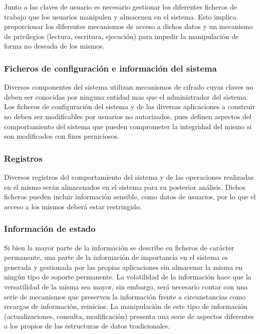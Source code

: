 Junto a las claves de usuario es necesario gestionar los diferentes ficheros de trabajo que los usuarios manipulen y almacenen en el sistema. Esto implica proporcionar los diferentes mecanismos de acceso a dichos datos y un mecanismo de privilegios (lectura, escritura, ejecución) para impedir la manipulación de forma no deseada de los mismos.

\subsubsection{Ficheros de configuración e información del sistema}

Diversos componentes del sistema utilizan mecanismos de cifrado cuyas claves no deben ser conocidas por ninguna entidad mas que el administrador del sistema. Los ficheros de configuración del sistema y de las diversas aplicaciones a construir no deben ser modificables por usuarios no autorizados, pues definen aspectos del comportamiento del sistema que pueden comprometer la integridad del mismo si son modificados con fines perniciosos.

\subsubsection{Registros}

Diversos registros del comportamiento del sistema y de las operaciones realizadas en el mismo serán almacenados en el sistema para su posterior análisis. Dichos ficheros pueden incluir información sensible, como datos de usuarios, por lo que el acceso a los mismos deberá estar restringido.

\subsubsection{Información de estado}

Si bien la mayor parte de la información se describe en ficheros de carácter permanente, una parte de la información de importancia en el sistema es generada y gestionada por las propias aplicaciones sin almacenar la misma en ningún tipo de soporte permanente. La volatilidad de la información hace que la versatilidad de la misma sea mayor, sin embargo, será necesario contar con una serie de mecanismos que preserven la información frente a circunstancias como recargas de información, reinicios. La manipulación de este tipo de información (actualizaciones, consulta, modificación) presenta una serie de aspectos diferentes a los propios de las estructuras de datos tradicionales.

